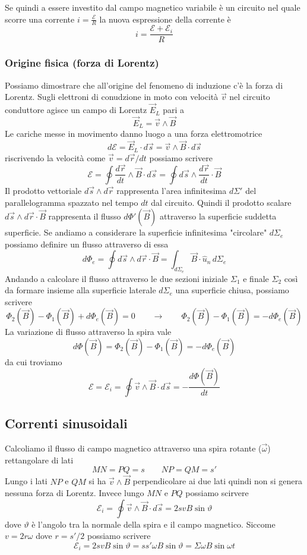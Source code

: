 \documentclass[x11names]{report}
\begin{document}
Se quindi a essere investito dal campo magnetico variabile è un circuito nel quale scorre una corrente \(i = \frac{\mathcal{E}}{R}\) la nuova espressione della corrente è 
\[
i = \frac{\mathcal{E} + \mathcal{E}_i}{R}
\]

\subsubsection*{Origine fisica (forza di Lorentz)}
Possiamo dimostrare che all'origine del fenomeno di induzione c'è la forza di Lorentz. Sugli elettroni di conudzione in moto con velocità \(\vec{v}\) nel circuito conduttore agisce un campo di Lorentz \(\vec{E}_L\) pari a
\[
\vec{E}_L = \vec{v}\wedge\vec{B}
\]
Le cariche messe in movimento danno luogo a una forza elettromotrice
\[
d\mathcal{E} = \vec{E}_L \cdot d\vec{s} = \vec{v}\wedge\vec{B} \cdot d\vec{s}
\]
riscrivendo la velocità come \(\vec{v}=d\vec{r}/dt\) possiamo scrivere
\[
\mathcal{E} = \oint  \frac{d\vec{r}}{dt}\wedge\vec{B}\cdot d\vec{s} = \oint  d\vec{s}\wedge\frac{d\vec{r}}{dt}\cdot \vec{B}
\]
Il prodotto vettoriale \(d\vec{s}\wedge d\vec{r}\) rappresenta l'area infinitesima \(d\Sigma'\) del parallelogramma spazzato nel tempo \(dt\) dal circuito. Quindi il prodotto scalare \(d\vec{s}\wedge d\vec{r}\cdot \vec{B}\) rappresenta il flusso \(d\Phi'(\vec{B})\) attraverso la superficie suddetta superficie. Se andiamo a considerare la superficie infinitesima "circolare" \(d\Sigma_e\) possiamo definire un flusso attraverso di essa
\[
d\Phi_e = \oint d\vec{s}\wedge d\vec{r}\cdot \vec{B} = \int_{d\Sigma_e} \vec{B}\cdot \hat{u}_n \, d\Sigma_e
\]
Andando a calcolare il flusso attraverso le due sezioni iniziale \(\Sigma_1\) e finale \(\Sigma_2\) così da formare insieme alla superficie laterale \(d\Sigma_e\) una superficie chiusa, possiamo scrivere
\[
\Phi_2 (\vec{B})- \Phi_1(\vec{B}) + d\Phi_e(\vec{B}) = 0  \qquad \to \qquad \Phi_2 (\vec{B})- \Phi_1(\vec{B}) =  -d\Phi_e(\vec{B}) 
\]
La variazione di flusso attraverso la spira vale
\[
d\Phi(\vec{B}) = \Phi_2 (\vec{B})- \Phi_1(\vec{B}) = -d\Phi_e(\vec{B}) 
\]
da cui troviamo
\begin{equation}
	\mathcal{E} = \mathcal{E}_i = \oint \vec{v}\wedge\vec{B}\cdot d\vec{s} = -\frac{d\Phi(\vec{B})}{dt}
\end{equation}

\subsection{Correnti sinusoidali}
Calcoliamo il flusso di campo magnetico attraverso una spira rotante (\(\vec
\omega\)) rettangolare di lati 
\[
MN = PQ = s \qquad NP = QM = s'
\]
Lungo i lati \(NP\) e \(QM\) si ha \(\vec{v}\wedge\vec{B}\) perpendicolare ai due lati quindi non si genera nessuna forza di Lorentz. Invece lungo \(MN\) e \(PQ\) possiamo scirvere
\[
\mathcal{E}_i = \oint \vec{v}\wedge\vec{B} \cdot d\vec{s} = 2svB\sin\vartheta
\]
dove \(\vartheta\) è l'angolo tra la normale della spira e il campo magnetico. Siccome \(v=2r\omega\) dove \(r = s'/2\) possiamo scrivere
\[
\mathcal{E}_i = 2svB\sin\vartheta = ss'\omega B\sin\vartheta = \Sigma \omega B\sin\omega t
\]
\end{document}
